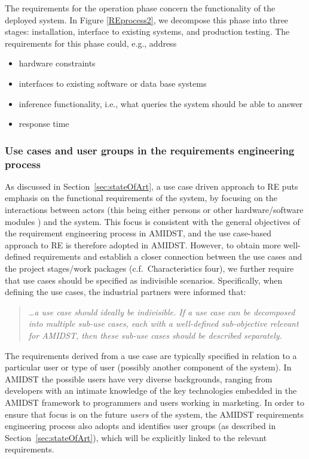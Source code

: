 The requirements for the operation phase concern the functionality of the deployed system. In Figure \ref{REprocess2}, we decompose this phase into three stages: installation, interface to existing systems, and production testing. The requirements for this phase could, e.g., address
\begin{itemize}
 \item hardware constraints
 \item interfaces to existing software or data base systems
 \item inference functionality, i.e., what queries the system should be able to answer
 \item response time
\end{itemize}


\subsubsection{Use cases and user groups in the requirements engineering process}

As discussed in Section~\ref{sec:stateOfArt}, a use case driven approach to RE puts emphasis on
the functional requirements of the system, by focusing on the
interactions between actors (this being either persons or other hardware/software modules ) and the system. This focus
is consistent with the general objectives of the requirement engineering process in AMIDST, and the use case-based
approach to RE is therefore adopted in AMIDST. However, to obtain more well-defined
requirements and establish a closer connection
between the use cases and the project stages/work packages (c.f.\ Characteristics four), we further require that use
cases should be specified as indivisible scenarios. Specifically, when defining the use cases, 
the industrial partners were informed that:

\begin{quote}
\emph{  \ldots a use case should ideally be indivisible. If a use case can be decomposed into multiple
  sub-use cases, each with a well-defined sub-objective relevant for AMIDST, then these sub-use cases should be
  described separately.}
\end{quote}

The requirements derived from a use case are typically specified in relation to a particular user or type of user (possibly another
component of the system). In AMIDST the possible users have very diverse backgrounds, ranging from developers with an
intimate knowledge of the key technologies embedded in the AMIDST framework to programmers and users working in
marketing. In order to ensure that focus is on the future \emph{users} of the system, the AMIDST requirements
engineering process also adopts and identifies user groups (as described in Section~\ref{sec:stateOfArt}), which will be
explicitly linked to the relevant requirements.

